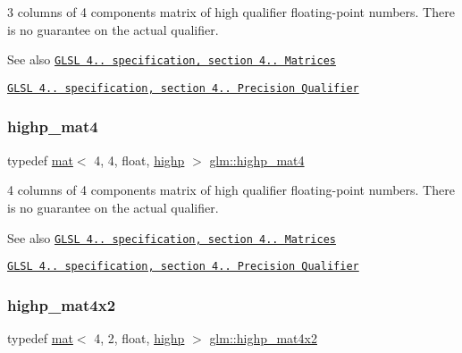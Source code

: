3 columns of 4 components matrix of high qualifier floating-\/point numbers. There is no guarantee on the actual qualifier.

\begin{DoxySeeAlso}{See also}
\href{http://www.opengl.org/registry/doc/GLSLangSpec.4.20.8.pdf}{\tt G\+L\+SL 4.. specification, section 4.. Matrices} 

\href{http://www.opengl.org/registry/doc/GLSLangSpec.4.20.8.pdf}{\tt G\+L\+SL 4.. specification, section 4.. Precision Qualifier} 
\end{DoxySeeAlso}
\mbox{\label{group__core__precision_gab46132805773d55f00fce859bc71e799}} 
\subsubsection{\texorpdfstring{highp\+\_\+mat4}{highp\_mat4}}
{\footnotesize\ttfamily typedef \mbox{\hyperlink{structglm_1_1mat}{mat}}$<$ 4, 4, float, \mbox{\hyperlink{namespaceglm_a36ed105b07c7746804d7fdc7cc90ff25ac6f7eab42eacbb10d59a58e95e362074}{highp}} $>$ \mbox{\hyperlink{group__core__precision_gab46132805773d55f00fce859bc71e799}{glm\+::highp\+\_\+mat4}}}

4 columns of 4 components matrix of high qualifier floating-\/point numbers. There is no guarantee on the actual qualifier.

\begin{DoxySeeAlso}{See also}
\href{http://www.opengl.org/registry/doc/GLSLangSpec.4.20.8.pdf}{\tt G\+L\+SL 4.. specification, section 4.. Matrices} 

\href{http://www.opengl.org/registry/doc/GLSLangSpec.4.20.8.pdf}{\tt G\+L\+SL 4.. specification, section 4.. Precision Qualifier} 
\end{DoxySeeAlso}
\mbox{\label{group__core__precision_ga0355949c79024224f7e9cfa06bc82153}} 
\subsubsection{\texorpdfstring{highp\+\_\+mat4x2}{highp\_mat4x2}}
{\footnotesize\ttfamily typedef \mbox{\hyperlink{structglm_1_1mat}{mat}}$<$ 4, 2, float, \mbox{\hyperlink{namespaceglm_a36ed105b07c7746804d7fdc7cc90ff25ac6f7eab42eacbb10d59a58e95e362074}{highp}} $>$ \mbox{\hyperlink{group__core__precision_ga0355949c79024224f7e9cfa06bc82153}{glm\+::highp\+\_\+mat4x2}}}


